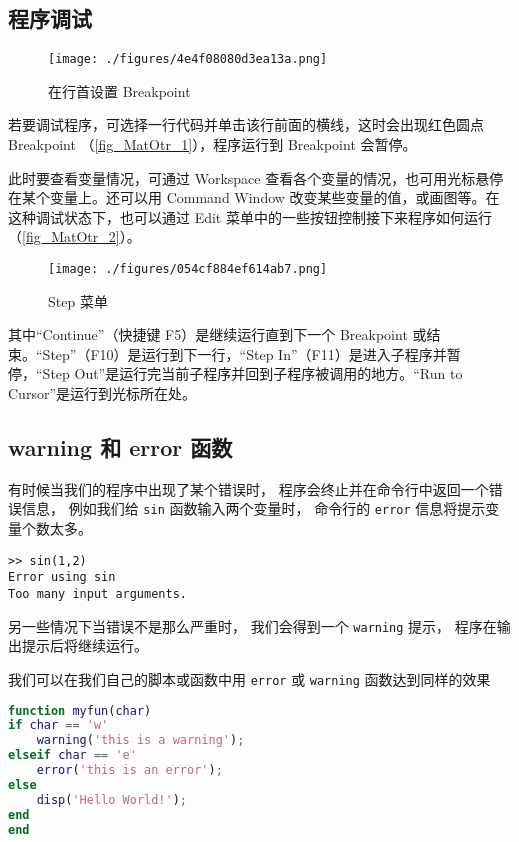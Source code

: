 

\subsection{程序调试}
\begin{figure}[ht]
\centering
\texttt{[image: ./figures/4e4f08080d3ea13a.png]}
\caption{在行首设置 Breakpoint}\label{fig_MatOtr_1}
\end{figure}

若要调试程序，可选择一行代码并单击该行前面的横线，这时会出现红色圆点 Breakpoint （\autoref{fig_MatOtr_1}），程序运行到 Breakpoint 会暂停。

此时要查看变量情况，可通过 Workspace 查看各个变量的情况，也可用光标悬停在某个变量上。还可以用 Command Window 改变某些变量的值，或画图等。在这种调试状态下，也可以通过 Edit 菜单中的一些按钮控制接下来程序如何运行（\autoref{fig_MatOtr_2}）。
\begin{figure}[ht]
\centering
\texttt{[image: ./figures/054cf884ef614ab7.png]}
\caption{Step 菜单}\label{fig_MatOtr_2}
\end{figure}
其中“Continue”（快捷键 F5）是继续运行直到下一个 Breakpoint 或结束。“Step”（F10）是运行到下一行，“Step In”（F11）是进入子程序并暂停，“Step Out”是运行完当前子程序并回到子程序被调用的地方。“Run to Cursor”是运行到光标所在处。

\subsection{warning 和 error 函数}
有时候当我们的程序中出现了某个错误时， 程序会终止并在命令行中返回一个错误信息， 例如我们给 \verb|sin| 函数输入两个变量时， 命令行的 \verb|error| 信息将提示变量个数太多。
\begin{lstlisting}[language=matlabC]
>> sin(1,2)
Error using sin
Too many input arguments.
\end{lstlisting}
另一些情况下当错误不是那么严重时， 我们会得到一个 \verb|warning| 提示， 程序在输出提示后将继续运行。

我们可以在我们自己的脚本或函数中用 \verb|error| 或 \verb|warning| 函数达到同样的效果

\begin{lstlisting}[language=matlab]
function myfun(char)
if char == 'w'
    warning('this is a warning');
elseif char == 'e'
    error('this is an error');
else
    disp('Hello World!');
end
end
\end{lstlisting}

